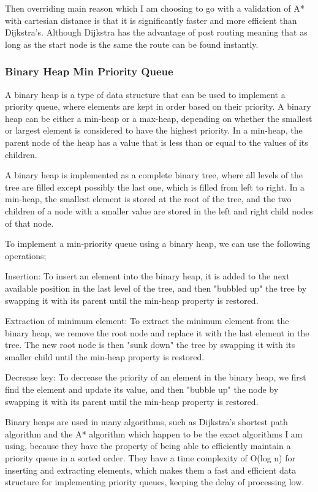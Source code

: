 \begin{FlushLeft}
    Then overriding main reason which I am choosing to go with a validation of A* with cartesian distance is that it is significantly faster and more efficient than Dijkstra's. Although Dijkstra has the advantage of post routing meaning that as long as the start node is the same the route can be found instantly. 
    \bk

    \subsubsection{Binary Heap Min Priority Queue}
    A binary heap is a type of data structure that can be used to implement a priority queue, where elements are kept in order based on their priority. A binary heap can be either a min-heap or a max-heap, depending on whether the smallest or largest element is considered to have the highest priority. In a min-heap, the parent node of the heap has a value that is less than or equal to the values of its children.\\ \bk

    A binary heap is implemented as a complete binary tree, where all levels of the tree are filled except possibly the last one, which is filled from left to right. In a min-heap, the smallest element is stored at the root of the tree, and the two children of a node with a smaller value are stored in the left and right child nodes of that node.\\ \bk
    
    To implement a min-priority queue using a binary heap, we can use the following operations;\\ \bk

    Insertion: To insert an element into the binary heap, it is added to the next available position in the last level of the tree, and then "bubbled up" the tree by swapping it with its parent until the min-heap property is restored.\\ \bk
    
    Extraction of minimum element: To extract the minimum element from the binary heap, we remove the root node and replace it with the last element in the tree. The new root node is then "sunk down" the tree by swapping it with its smaller child until the min-heap property is restored.\\ \bk
    
    Decrease key: To decrease the priority of an element in the binary heap, we first find the element and update its value, and then "bubble up" the node by swapping it with its parent until the min-heap property is restored.\\ \bk
    
    Binary heaps are used in many algorithms, such as Dijkstra's shortest path algorithm and the A* algorithm which happen to be the exact algorithms I am using, because they have the property of being able to efficiently maintain a priority queue in a sorted order. They have a time complexity of O(log n) for inserting and extracting elements, which makes them a fast and efficient data structure for implementing priority queues, keeping the delay of processing low.\\ \bk

    \bk
\end{FlushLeft}